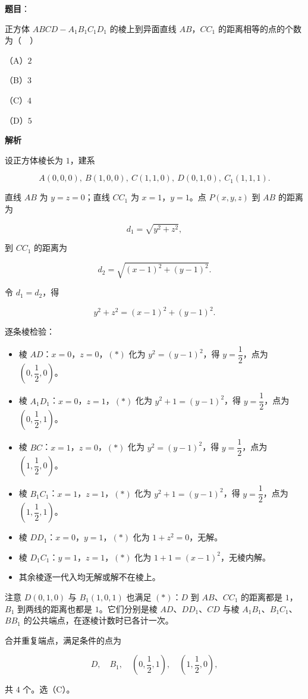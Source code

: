 \begin{answer}

\textbf{题目}：

正方体 $ABCD-A_1B_1C_1D_1$ 的棱上到异面直线 $AB$，$CC_1$ 的距离相等的点的个数为（　）

（A）$2$

（B）$3$

（C）$4$

（D）$5$

\textbf{解析}

设正方体棱长为 $1$，建系

\nopagebreak[4]
\[A(0,0,0),\ B(1,0,0),\ C(1,1,0),\ D(0,1,0),\ C_1(1,1,1).\]

直线 $AB$ 为 $y=z=0$；直线 $CC_1$ 为 $x=1$，$y=1$。点 $P(x,y,z)$ 到 $AB$ 的距离为

\nopagebreak[4]
\[d_1=\sqrt{y^2+z^2},\]

到 $CC_1$ 的距离为

\nopagebreak[4]
\[d_2=\sqrt{(x-1)^2+(y-1)^2}.\]

令 $d_1=d_2$，得

\nopagebreak[4]
\[y^2+z^2=(x-1)^2+(y-1)^2. \tag{$\ast$}\]

逐条棱检验：

\begin{itemize}
\item 棱 $AD$：$x=0$，$z=0$，$(\ast)$ 化为 $y^2=(y-1)^2$，得 $y=\dfrac12$，点为 $\left(0,\dfrac12,0\right)$。
\item 棱 $A_1D_1$：$x=0$，$z=1$，$(\ast)$ 化为 $y^2+1=(y-1)^2$，得 $y=\dfrac12$，点为 $\left(0,\dfrac12,1\right)$。
\item 棱 $BC$：$x=1$，$z=0$，$(\ast)$ 化为 $y^2=(y-1)^2$，得 $y=\dfrac12$，点为 $\left(1,\dfrac12,0\right)$。
\item 棱 $B_1C_1$：$x=1$，$z=1$，$(\ast)$ 化为 $y^2+1=(y-1)^2$，得 $y=\dfrac12$，点为 $\left(1,\dfrac12,1\right)$。
\item 棱 $DD_1$：$x=0$，$y=1$，$(\ast)$ 化为 $1+z^2=0$，无解。
\item 棱 $D_1C_1$：$y=1$，$z=1$，$(\ast)$ 化为 $1+1=(x-1)^2$，无棱内解。
\item 其余棱逐一代入均无解或解不在棱上。
\end{itemize}

注意 $D(0,1,0)$ 与 $B_1(1,0,1)$ 也满足 $(\ast)$：$D$ 到 $AB$、$CC_1$ 的距离都是 $1$，$B_1$ 到两线的距离也都是 $1$。它们分别是棱 $AD$、$DD_1$、$CD$ 与棱 $A_1B_1$、$B_1C_1$、$BB_1$ 的公共端点，在逐棱计数时已各计一次。

合并重复端点，满足条件的点为

\nopagebreak[4]
\[D,\quad B_1,\quad \left(0,\frac12,1\right),\quad \left(1,\frac12,0\right),\]

共 $4$ 个。选（C）。


\end{answer}
